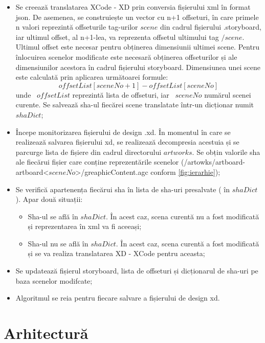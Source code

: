 \begin{itemize}  
\item Se creează translatarea XCode - XD prin conversia fișierului xml în format json. De asemenea, se construiește un vector cu n+1 offseturi, în care primele n valori reprezintă offseturile tag-urilor $scene$ din cadrul fișierului .storyboard, iar ultimul offset, al n+1-lea, va reprezenta offsetul ultimului tag $/scene$. Ultimul offset este necesar pentru obținerea dimensiunii ultimei scene. 
Pentru înlocuirea scenelor modificate este necesară obținerea offseturilor și ale dimensiunilor acestora în cadrul fișierului storyboard. Dimensiunea unei scene este calculată prin aplicarea următoarei formule:
\[offsetList[sceneNo + 1] - offsetList[sceneNo]\]
unde ~$offsetList$ reprezintă lista de offseturi, iar ~$sceneNo$ numărul scenei curente. Se salvează sha-ul fiecărei scene translatate într-un dicționar numit $shaDict$;

\item Începe monitorizarea fișierului de design .xd. În momentul în care se realizează salvarea fișierului xd, se realizează decompresia acestuia și se parcurge lista de fișiere din cadrul directorului $artworks$. Se obțin valorile sha ale fiecărui fișier care conține reprezentările scenelor (/artowks/artboard-artboard<$sceneNo$>/greaphicContent.agc conform \ref{fig:ierarhie}); 
\item Se verifică apartenența fiecărui sha în lista de sha-uri presalvate ( în $shaDict$). Apar două situații:
    \begin{itemize}  
    \item Sha-ul se află în $shaDict$. În acest caz, scena curentă nu a fost modificată și reprezentarea în xml va fi aceeași;
    \item Sha-ul nu se află în $shaDict$. În acest caz, scena curentă a fost modificată și se va realiza translatarea XD - XCode pentru aceasta;
    \end{itemize}
\item Se updatează fișierul storyboard, lista de offseturi și dicționarul de sha-uri pe baza scenelor modifcate;
\item Algoritmul se reia pentru fiecare salvare a fișierului de design xd.
\end{itemize}


\section{Arhitectură}

